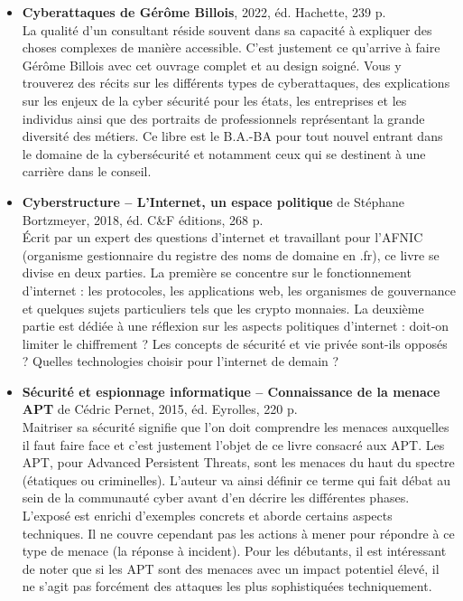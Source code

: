 \documentclass[a4paper]{article}
\begin{document}
\begin{itemize}

\item \textbf{Cyberattaques de Gérôme Billois}, 2022, éd. Hachette, 239 p.
\\
La qualité d’un consultant réside souvent dans sa capacité à expliquer des choses complexes de manière accessible. C’est justement ce qu’arrive à faire Gérôme Billois avec cet ouvrage complet et au design soigné. Vous y trouverez des récits sur les différents types de cyberattaques, des explications sur les enjeux de la cyber sécurité pour les états, les entreprises et les individus ainsi que des portraits de professionnels représentant la grande diversité des métiers. Ce libre est le B.A.-BA pour tout nouvel entrant dans le domaine de la cybersécurité et notamment ceux qui se destinent à une carrière dans le conseil.



\item \textbf{Cyberstructure – L’Internet, un espace politique} de Stéphane Bortzmeyer, 2018, éd. C\&F éditions, 268 p.
\\
Écrit par un expert des questions d’internet et travaillant pour l’AFNIC (organisme gestionnaire du registre des noms de domaine en .fr), ce livre se divise en deux parties. La première se concentre sur le fonctionnement d’internet : les protocoles, les applications web, les organismes de gouvernance et quelques sujets particuliers tels que les crypto monnaies. La deuxième partie est dédiée à une réflexion sur les aspects politiques d’internet : doit-on limiter le chiffrement ? Les concepts de sécurité et vie privée sont-ils opposés ? Quelles technologies choisir pour l’internet de demain ?


\item \textbf{Sécurité et espionnage informatique – Connaissance de la menace APT} de Cédric Pernet, 2015, éd. Eyrolles, 220 p.
\\
Maitriser sa sécurité signifie que l’on doit comprendre les menaces auxquelles il faut faire face et c’est justement l’objet de ce livre consacré aux APT. Les APT, pour Advanced Persistent Threats, sont les menaces du haut du spectre (étatiques ou criminelles). L’auteur va ainsi définir ce terme qui fait débat au sein de la communauté cyber avant d’en décrire les différentes phases. L’exposé est enrichi d’exemples concrets et aborde certains aspects techniques. Il ne couvre cependant pas les actions à mener pour répondre à ce type de menace (la réponse à incident). Pour les débutants, il est intéressant de noter que si les APT sont des menaces avec un impact potentiel élevé, il ne s’agit pas forcément des attaques les plus sophistiquées techniquement.



\end{itemize}
\end{document}
